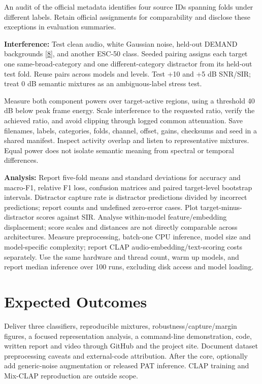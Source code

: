 \documentclass[a4paper,11pt]{article}
\begin{document}
An audit of the official metadata identifies four source IDs spanning folds under different labels. Retain official assignments for comparability and disclose these exceptions in evaluation summaries.

\textbf{Interference:} Test clean audio, white Gaussian noise, held-out DEMAND backgrounds [\hyperref[ref:8]{8}], and another ESC-50 class. Seeded pairing assigns each target one same-broad-category and one different-category distractor from its held-out test fold. Reuse pairs across models and levels. Test +10 and +5 dB SNR/SIR; treat 0 dB semantic mixtures as an ambiguous-label stress test.

Measure both component powers over target-active regions, using a threshold 40 dB below peak frame energy. Scale interference to the requested ratio, verify the achieved ratio, and avoid clipping through logged common attenuation. Save filenames, labels, categories, folds, channel, offset, gains, checksums and seed in a shared manifest. Inspect activity overlap and listen to representative mixtures. Equal power does not isolate semantic meaning from spectral or temporal differences.

\textbf{Analysis:} Report five-fold means and standard deviations for accuracy and macro-F1, relative F1 loss, confusion matrices and paired target-level bootstrap intervals. Distractor capture rate is distractor predictions divided by incorrect predictions; report counts and undefined zero-error cases. Plot target-minus-distractor scores against SIR. Analyse within-model feature/embedding displacement; score scales and distances are not directly comparable across architectures. Measure preprocessing, batch-one CPU inference, model size and model-specific complexity; report CLAP audio-embedding/text-scoring costs separately. Use the same hardware and thread count, warm up models, and report median inference over 100 runs, excluding disk access and model loading.

\section{Expected Outcomes}

Deliver three classifiers, reproducible mixtures, robustness/capture/margin figures, a focused representation analysis, a command-line demonstration, code, written report and video through GitHub and the project site. Document dataset preprocessing caveats and external-code attribution. After the core, optionally add generic-noise augmentation or released PAT inference. CLAP training and Mix-CLAP reproduction are outside scope.
\end{document}
